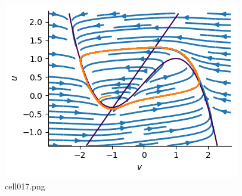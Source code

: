 \begin{figure}[ht]
	\centering
	\includegraphics[scale=0.8, max width=\linewidth]{./fig/neuron-model/fhn/cell017.png}
	\caption{cell017.png}
	\label{cell017.png}
\end{figure}
